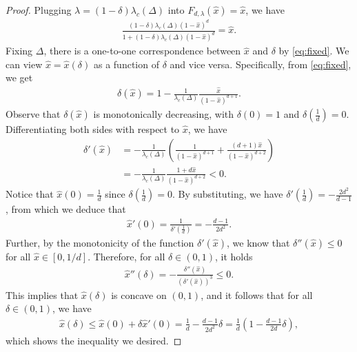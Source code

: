 \documentclass[11pt]{article}
\theoremstyle{plain}
\theoremstyle{definition}
\theoremstyle{remark}
\newcommand{\tuple}[1]{\left(#1\right)}
\newcommand{\tp}{\tuple}
\begin{document}
\begin{proof}
    Plugging $\lambda = (1-\delta) \lambda_c(\Delta)$ into $F_{d,\lambda}(\hat x)=\hat x$, we have
    \begin{align} \label{eq:fixed}
        \frac{(1-\delta)\lambda_c(\Delta)(1-\hat x)^d}{1+(1-\delta)\lambda_c(\Delta)(1-\hat x)^d}=\hat x.
    \end{align} 
    Fixing $\Delta$, there is a one-to-one correspondence between $\hat x$ and $\delta$ by \cref{eq:fixed}.
    We can view $\hat x = \hat x (\delta)$ as a function of $\delta$ and vice versa.
    Specifically, from \cref{eq:fixed}, we get
    \begin{align*}
        \delta(\hat x) = 1-\frac{1}{\lambda_c(\Delta)}\frac{\hat x}{(1-\hat x)^{d+1}}.
    \end{align*}
    Observe that $\delta(\hat x)$ is monotonically decreasing, with $\delta(0)=1$ and $\delta(\frac{1}{d})=0$.
    Differentiating both sides with respect to $\hat x$, we have
    \begin{align*}
        \delta'(\hat x) &= -\frac{1}{\lambda_c(\Delta)}\tp{\frac{1}{(1-\hat x)^{d+1}}+\frac{(d+1)\hat x}{(1-\hat x)^{d+2}}}\\
        &=-\frac{1}{\lambda_c(\Delta)}\frac{1+d\hat x}{(1-\hat x)^{d+2}} < 0.
    \end{align*}
    Notice that $\hat x(0)=\frac{1}{d}$ since $\delta(\frac{1}{d}) = 0$.
    By substituting, we have $\delta'(\frac{1}{d})=-\frac{2d^2}{d-1}$, from which we deduce that
    \begin{align*}
        \hat x'(0)=\frac{1}{\delta'(\frac{1}{d})}=-\frac{d-1}{2d^2}.
    \end{align*}
    Further, by the monotonicity of the function $\delta'(\hat{x})$, we know that $\delta''(\hat x)\leq0$ for all $\hat x\in[0,1/d]$.
    Therefore, for all $\delta\in(0,1)$, it holds
    \begin{align*}
        \hat x''(\delta)=-\frac{\delta''(\hat x)}{(\delta'(\hat x))^3} \leq 0.
    \end{align*}
    This implies that $\hat x(\delta)$ is concave on $(0,1)$, 
    and it follows that for all $\delta \in (0,1)$, we have
    \begin{align*}
        \hat x(\delta)\leq\hat x(0)+\delta \hat x'(0)=\frac{1}{d}-\frac{d-1}{2d^2}\delta=\frac{1}{d}\tp{1-\frac{d-1}{2d}\delta},
    \end{align*}
    which shows the inequality we desired.
\end{proof}    
    
\end{document}
